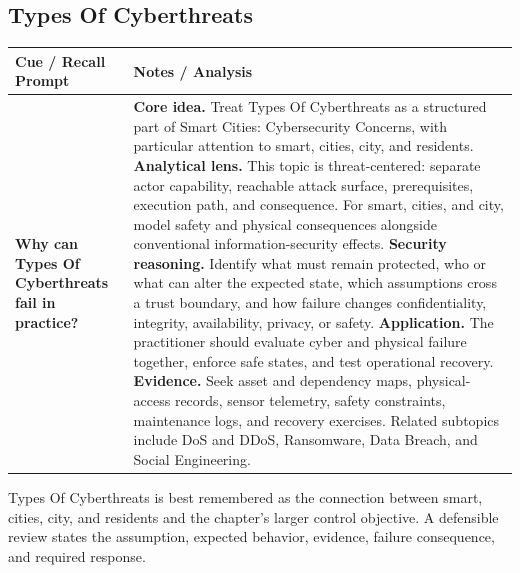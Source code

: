 \documentclass[11pt]{article}
\newcommand{\CornellHeader}{%
\rowcolor{Navy}\color{white}\bfseries Cue / Recall Prompt & \color{white}\bfseries Notes / Analysis\\\hline}
\newcommand{\CornellRow}[2]{%
\cellcolor{CueGray}\RaggedRight\textbf{#1} & \RaggedRight #2\\\hline}
\begin{document}
\subsection*{Types Of Cyberthreats}
\begin{longtable}{>{\RaggedRight\arraybackslash}p{}|>{\RaggedRight\arraybackslash}p{}}
\CornellHeader
\CornellRow{Why can Types Of Cyberthreats fail in practice?}{\textbf{Core idea.} Treat Types Of Cyberthreats as a structured part of Smart Cities: Cybersecurity Concerns, with particular attention to smart, cities, city, and residents. \textbf{Analytical lens.} This topic is threat-centered: separate actor capability, reachable attack surface, prerequisites, execution path, and consequence. For smart, cities, and city, model safety and physical consequences alongside conventional information-security effects. \textbf{Security reasoning.} Identify what must remain protected, who or what can alter the expected state, which assumptions cross a trust boundary, and how failure changes confidentiality, integrity, availability, privacy, or safety. \textbf{Application.} The practitioner should evaluate cyber and physical failure together, enforce safe states, and test operational recovery. \textbf{Evidence.} Seek asset and dependency maps, physical-access records, sensor telemetry, safety constraints, maintenance logs, and recovery exercises. Related subtopics include DoS and DDoS, Ransomware, Data Breach, and Social Engineering.}
\end{longtable}
\begin{topicsummary}
Types Of Cyberthreats is best remembered as the connection between smart, cities, city, and residents and the chapter's larger control objective. A defensible review states the assumption, expected behavior, evidence, failure consequence, and required response.
\end{topicsummary}
\end{document}
